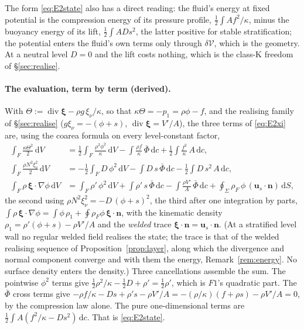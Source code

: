 \documentclass[11pt]{article}
\theoremstyle{definition}
\theoremstyle{remark}
\newcommand{\bu}{\mathbf{u}}
\newcommand{\bn}{\mathbf{n}}
\newcommand{\bxi}{\boldsymbol{\xi}}
\newcommand{\dS}{\,\mathrm{d}S}
\newcommand{\dV}{\,\mathrm{d}V}
\newcommand{\dc}{\,\mathrm{d}c}
\newcommand{\Div}{\operatorname{div}}
\newcommand{\Vol}{\mathcal V}
\begin{document}
The form \eqref{eq:E2state} also has a direct reading: the fluid's
energy at fixed potential is the compression energy of its pressure
profile, $\tfrac12\int Af^2/\kappa$, minus the buoyancy energy of its
lift, $\tfrac12\int ADs^2$, the latter positive for stable
stratification; the potential enters the fluid's own terms only
through $\delta\Vol$, which is the geometry. At a neutral level $D = 0$
and the lift costs nothing, which is the class-K freedom of
\S\ref{sec:realise}.

\paragraph{The evaluation, term by term (derived).} With $\Theta :=
\Div\bxi - \rho g\,\xi_\nu/\kappa$, so that $\kappa\Theta = -p_1 = \rho\phi
- f$, and the realising family of \S\ref{sec:realise} ($g\xi_\nu =
-(\phi + s)$, $\Div\bxi = V'/A$), the three terms of \eqref{eq:E2xi}
are, using the coarea formula on every level-constant factor,
\begin{align*}
  \int_F\frac{\kappa\Theta^2}{2}\dV
  &= \frac12\int_F\frac{\rho^2\phi^2}{\kappa}\dV
   - \int\frac{\rho f}{\kappa}\,\bar\Phi\dc
   + \frac12\int\frac{f^2}{\kappa}\,A\dc ,\\
  \int_F\frac{\rho N^2\xi_\nu^2}{2}\dV
  &= -\frac12\int_F D\,\phi^2\dV
   - \int D\,s\,\bar\Phi\dc
   - \frac12\int D\,s^2\,A\dc ,\\
  \int_F\rho\,\bxi\cdot\nabla\phi\dV
  &= \int_F\rho'\,\phi^2\dV
   + \int\rho'\,s\,\bar\Phi\dc
   - \int\frac{\rho V'}{A}\,\bar\Phi\dc
   + \oint_\Sigma\rho_F\,\phi\,(\bu_s\cdot\bn)\dS ,
\end{align*}
the second using $\rho N^2\xi_\nu^2 = -D\,(\phi + s)^2$, the third
after one integration by parts, $\int\rho\,\bxi\cdot\nabla\phi =
\int\phi\,\rho_1 + \oint\rho_F\phi\,\bxi\cdot\bn$, with the kinematic
density $\rho_1 = \rho'(\phi + s) - \rho V'/A$ and the \emph{welded}
trace $\bxi\cdot\bn = \bu_s\cdot\bn$. (At a stratified level wall no
regular welded field realises the state; the trace is that of the
welded realising sequence of Proposition~\ref{prop:layer}, along which
the divergence and normal component converge and with them the energy,
Remark~\ref{rem:energy}. No surface density enters the density.) Three
cancellations assemble the sum. The pointwise $\phi^2$ terms give
$\tfrac12\rho^2/\kappa - \tfrac12D + \rho' = \tfrac12\rho'$, which is
$F1$'s quadratic part. The $\bar\Phi$ cross terms give $-\rho f/\kappa -
Ds + \rho's - \rho V'/A = -(\rho/\kappa)(f + \rho s) - \rho V'/A = 0$, by
the compression law alone. The pure one-dimensional terms are
$\tfrac12\int A(f^2/\kappa - Ds^2)\dc$. That is \eqref{eq:E2state}.
\end{document}
